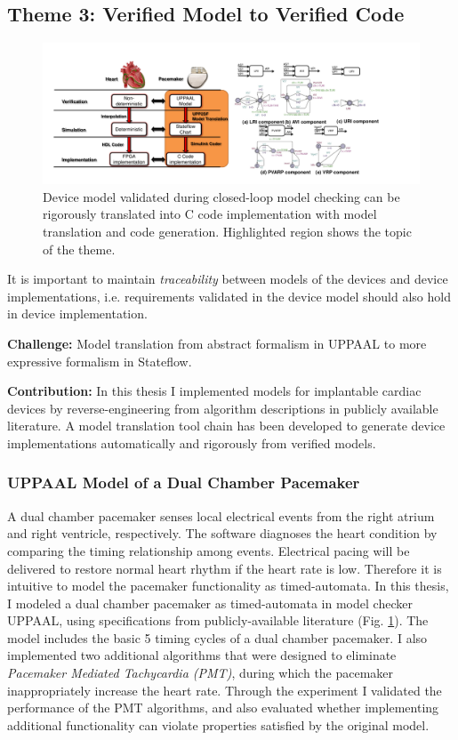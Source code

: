 \documentclass[a4paper,11pt]{article}
\begin{document}
\subsection{Theme 3: Verified Model to Verified Code}
\begin{figure}[t]
	\centering
	\includegraphics[scale=0.32]{figs/mb_device.pdf}
	\caption{\small Device model validated during closed-loop model checking can be rigorously translated into C code implementation with model translation and code generation. Highlighted region shows the topic of the theme.}
	\label{fig:mb_device}
\end{figure}
It is important to maintain \emph{traceability} between models of the devices and device implementations, i.e. requirements validated in the device model should also hold in device implementation.

\noindent\textbf{Challenge:} Model translation from abstract formalism in UPPAAL to more expressive formalism in Stateflow.

\noindent\textbf{Contribution:}
In this thesis I implemented models for implantable cardiac devices by reverse-engineering from algorithm descriptions in publicly available literature.
A model translation tool chain has been developed to generate device implementations automatically and rigorously from verified models.
\subsubsection{UPPAAL Model of a Dual Chamber Pacemaker}
A dual chamber pacemaker senses local electrical events from the right atrium and right ventricle, respectively.
The software diagnoses the heart condition by comparing the timing relationship among events.
Electrical pacing will be delivered to restore normal heart rhythm if the heart rate is low.
Therefore it is intuitive to model the pacemaker functionality as timed-automata.
In this thesis, I modeled a dual chamber pacemaker as timed-automata in model checker UPPAAL, using specifications from publicly-available literature (Fig. \ref{fig:mb_device}).
The model includes the basic 5 timing cycles of a dual chamber pacemaker.
I also implemented two additional algorithms that were designed to eliminate \emph{Pacemaker Mediated Tachycardia (PMT)}, during which the pacemaker inappropriately increase the heart rate.
Through the experiment I validated the performance of the PMT algorithms, and also evaluated whether implementing additional functionality can violate properties satisfied by the original model.
\end{document}
